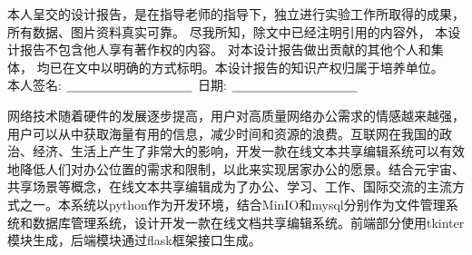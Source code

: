 

\thispagestyle{empty}
\vspace*{20pt}
\begin{center}
	{}
\end{center}
\par\vspace*{30pt}
\renewcommand{\baselinestretch}{2}
{%
	
本人呈交的设计报告，是在指导老师的指导下，独立进行实验工作所取得的成果，
所有数据、图片资料真实可靠。 尽我所知，除文中已经注明引用的内容外，
本设计报告不包含他人享有著作权的内容。
对本设计报告做出贡献的其他个人和集体，
均已在文中以明确的方式标明。本设计报告的知识产权归属于培养单位。\\[2cm]
	
	\hspace*{1cm}本人签名: $\underline{\hspace{3.5cm}}$
	\hspace{2cm}日期: $\underline{\hspace{3.5cm}}$\hfill\par}

\renewcommand{\baselinestretch}{1.5}  %

\begin{cnabstract}
网络技术随着硬件的发展逐步提高，用户对高质量网络办公需求的情感越来越强，用户可以从中获取海量有用的信息，减少时间和资源的浪费。互联网在我国的政治、经济、生活上产生了非常大的影响，开发一款在线文本共享编辑系统可以有效地降低人们对办公位置的需求和限制，以此来实现居家办公的愿景。结合元宇宙、共享场景等概念，在线文本共享编辑成为了办公、学习、工作、国际交流的主流方式之一。本系统以python作为开发环境，结合MinIO和mysql分别作为文件管理系统和数据库管理系统，设计开发一款在线文档共享编辑系统。前端部分使用tkinter模块生成，后端模块通过flask框架接口生成。


\end{cnabstract}
\par
\vspace*{2em}


